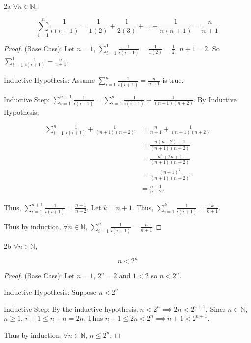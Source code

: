 \documentclass{article}
\newcommand{\N}{\mathbb{N}}
\begin{document}
\bigskip

\begin{claim}{2a}\label{Claim 2a.}
    $\forall n \in \N$:
    
    \[
        \sum_{i = 1}^{n} \frac{1}{i(i + 1)} = \frac{1}{1(2)} + \frac{1}{2(3)} + \dots + \frac{1}{n(n + 1)} = \frac{n}{n + 1}
    \] 
\end{claim}
\begin{proof}

    (Base Case): Let $n = 1$, $\sum_{i = 1}^{1} \frac{1}{i(i + 1)} = \frac{1}{1(2)} = \frac{1}{2}$. $n + 1 = 2$. So $\sum_{i = 1}^{1} \frac{1}{i(i + 1)} = \frac{n}{n+1}$.

    Inductive Hypothesis: Assume $\sum_{i = 1}^{n} \frac{1}{i(i + 1)} = \frac{n}{n + 1}$ is true.

    Inductive Step: $\sum_{i = 1}^{n + 1} \frac{1}{i(i + 1)} = \sum_{i = 1}^{n} \frac{1}{i(i + 1)} + \frac{1}{(n + 1)(n + 2)}$. By Inductive Hypothesis, 
    
    \begin{align*}
        \sum_{i = 1}^{n} \frac{1}{i(i + 1)} + \frac{1}{(n + 1)(n + 2)} &= \frac{n}{n + 1}+ \frac{1}{(n + 1)(n + 2)} \\
        &= \frac{n(n + 2) + 1}{(n + 1)(n+2)} \\
        &= \frac{n^2 + 2n + 1}{(n + 1)(n + 2)} \\
        &= \frac{(n + 1)^2}{(n + 1)(n + 2)} \\
        &= \frac{n + 1}{n + 2}.
    \end{align*}

    Thus, $\sum_{i = 1}^{n + 1} \frac{1}{i(i + 1)} = \frac{n + 1}{n + 2}$. Let $k = n +1$. Thus, $\sum_{i = 1}^{k} \frac{1}{i(i + 1)} = \frac{k}{k + 1}$.    

    Thus by induction, $\forall n \in \N$,
    $\sum_{i = 1}^{n} \frac{1}{i(i + 1)} = \frac{n}{n + 1}$
\end{proof}

\begin{claim}{2b}\label{Claim 2b.}
    $\forall n \in \N$,
    
    \[n < 2^n\]
\end{claim}
\begin{proof}
    (Base Case): Let $n = 1$, $2^n = 2$ and $1 < 2$ so $n < 2^n$.

    Inductive Hypothesis: Suppose $n < 2^n$
    
    Inductive Step: By the inductive hypothesis, $n < 2^n \implies 2n < 2^{n + 1}$. Since $n \in \N$, $n \geq 1$, $n + 1 \leq n + n = 2n$. Thus $n + 1 \leq 2n < 2^n \implies n + 1 < 2^{n + 1}$.
    
    
    Thus by induction, $\forall n \in \N$, $n \leq 2^n$.  
\end{proof}
\end{document}
